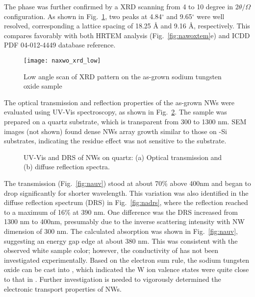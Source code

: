 The  phase was further confirmed by a XRD scanning from 4 to 10 degree in $2\theta/\Omega$ configuration. As shown in Fig.~\ref{fig:naxrdlow}, two peaks at 4.84$^{\circ}$ and 9.65$^{\circ}$ were well resolved, corresponding a lattice spacing of 18.25 \si{\angstrom} and 9.16 \si{\angstrom}, respectively. This compares favorably with both HRTEM analysis (Fig.~\ref{fig:nawoxtem}e) and ICDD PDF 04-012-4449 database reference. 
\begin{figure}[htb]
\centering
\texttt{[image: naxwo\_xrd\_low]}
\caption[Low angle XRD pattern on the as-grown sodium tungsten oxide]{Low angle scan of XRD pattern on the as-grown sodium tungsten oxide sample}
\label{fig:naxrdlow}
\end{figure}

The optical transmission and reflection properties of the as-grown  NWs were evaluated using UV-Vis spectroscopy, as shown in Fig.~\ref{fig:ch3naxuvvis}. The sample was prepared on a quartz substrate, which is transparent from 300 to 1300 nm. SEM images (not shown) found dense NWs array growth similar to those on -Si substrates, indicating the residue effect was not sensitive to the substrate. 
\begin{figure}[htb]
\centering
{}\hspace{0.04\textwidth}
\caption[UV-Vis and DRS of  NWs on quartz]{UV-Vis and DRS of  NWs on quartz: (a) Optical transmission and (b) diffuse reflection spectra.}
\label{fig:ch3naxuvvis}
\end{figure}
The transmission (Fig.~\ref{fig:nauv}) stood at about 70\% above 400nm and began to drop significantly for shorter wavelength. This variation was also identified in the diffuse reflection spectrum (DRS) in Fig.~\ref{fig:nadrs}, where the reflection reached to a maximum of 16\% at 390 nm. One difference was the DRS increased from 1300 nm to 400nm, presumably due to the inverse scattering intensity with NW dimension of 300 nm. The calculated absorption was shown in Fig.~\ref{fig:nauv}, suggesting an energy gap edge at about 380 nm. This was consistent with the observed white sample color; however, the conductivity of  has not been investigated experimentally. Based on the electron sum rule, the sodium tungsten oxide can be cast into , which indicated the W ion valence states were quite close to that in . Further investigation is needed to vigorously determined the electronic transport properties of  NWs. 

